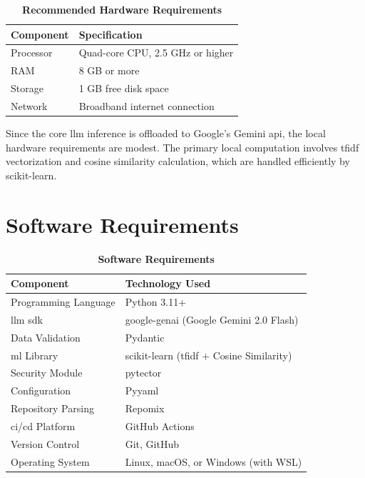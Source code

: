 \begin{table}[H]
\centering
\renewcommand{\arraystretch}{1.3}
\setlength{\arrayrulewidth}{0.5mm}
\caption[Recommended Hardware Requirements]{\textbf{Recommended Hardware Requirements}}
\vspace{2mm}
\begin{tabular}{|p{4cm}|p{8cm}|}
\hline
\textbf{Component} & \textbf{Specification} \\
\hline
Processor & Quad-core CPU, 2.5 GHz or higher \\
\hline
RAM & 8 GB or more \\
\hline
Storage & 1 GB free disk space \\
\hline
Network & Broadband internet connection \\
\hline
\end{tabular}
\end{table}

Since the core \gls{llm} inference is offloaded to Google's Gemini \gls{api}, the local hardware requirements are modest. The primary local computation involves \gls{tfidf} vectorization and cosine similarity calculation, which are handled efficiently by scikit-learn.

\section{Software Requirements}

\begin{table}[H]
\centering
\renewcommand{\arraystretch}{1.3}
\setlength{\arrayrulewidth}{0.5mm}
\caption[Software Requirements]{\textbf{Software Requirements}}
\vspace{2mm}
\begin{tabular}{|p{4.5cm}|p{7.5cm}|}
\hline
\textbf{Component} & \textbf{Technology Used} \\
\hline
Programming Language & Python 3.11+ \\
\hline
\gls{llm} \gls{sdk} & google-genai (Google Gemini 2.0 Flash) \\
\hline
Data Validation & Pydantic \\
\hline
\gls{ml} Library & scikit-learn (\gls{tfidf} + Cosine Similarity) \\
\hline
Security Module & pytector \\
\hline
Configuration & Py\gls{yaml} \\
\hline
Repository Parsing & Repomix \\
\hline
\gls{ci}/\gls{cd} Platform & GitHub Actions \\
\hline
Version Control & Git, GitHub \\
\hline
Operating System & Linux, macOS, or Windows (with WSL) \\
\hline
\end{tabular}
\end{table}

